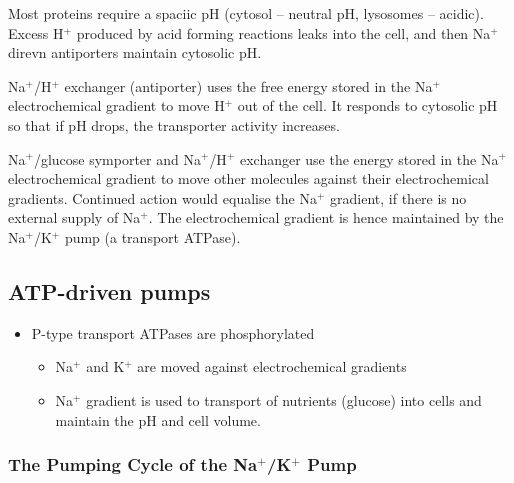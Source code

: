 \documentclass[11pt]{scrartcl}
\begin{document}
\begin{example}

  Most proteins require a spaciic pH (cytosol -- neutral pH, lysosomes
  -- acidic). Excess H$^{+}$ produced by acid forming reactions leaks
  into the cell, and then Na$^{+}$ direvn antiporters maintain
  cytosolic pH.

\end{example}

\begin{example}

  Na$^{+}$/H$^+$ exchanger (antiporter) uses the free energy stored in
  the Na$^{+}$ electrochemical gradient to move H$^{+}$ out of the
  cell. It responds to cytosolic pH so that if pH drops, the
  transporter activity increases.

\end{example}

Na$^{+}$/glucose symporter and Na$^{+}$/H$^{+}$ exchanger use the
energy stored in the Na$^{+}$ electrochemical gradient to move other
molecules against their electrochemical gradients. Continued action
would equalise the Na$^{+}$ gradient, if there is no external supply
of Na$^{+}$. The electrochemical gradient is hence maintained by the
Na$^{+}$/K$^{+}$ pump (a transport ATPase).

\subsection{ATP-driven pumps}

\begin{itemize}
\item P-type transport ATPases are phosphorylated
  
  \begin{itemize}
  \item Na$^{+}$ and K$^{+}$ are moved against electrochemical
    gradients
  \item Na$^{+}$ gradient is used to transport of nutrients (glucose)
    into cells and maintain the pH and cell volume.
  \end{itemize}
\end{itemize}

\subsubsection{The Pumping Cycle of the Na$^+$/K$^+$ Pump}
\end{document}
